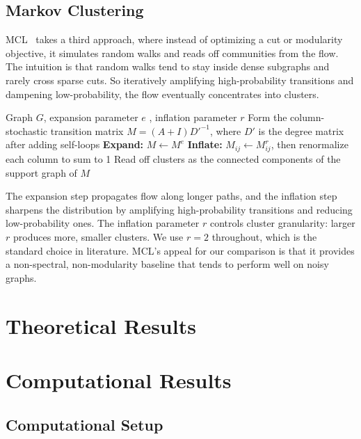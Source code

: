 \documentclass{article}
\theoremstyle{definition}
\theoremstyle{remark}
\begin{document}
\subsection{Markov Clustering}

MCL~\cite{vandongen2000} takes a third approach, where instead of optimizing a cut or modularity objective, it simulates random walks and reads off communities from the flow. The intuition is that random walks tend to stay inside dense subgraphs and rarely cross sparse cuts. So iteratively amplifying high-probability transitions and dampening low-probability, the flow eventually concentrates into clusters.

\begin{algorithm}[H]
\caption{Markov Clustering}
\begin{algorithmic}[1]
\Require Graph $G$, expansion parameter $e$ , inflation parameter $r$
\State Form the column-stochastic transition matrix $M = (A + I) D'^{-1}$, where $D'$ is the degree matrix after adding self-loops
\Repeat
    \State \textbf{Expand:} $M \gets M^e$
    \State \textbf{Inflate:} $M_{ij} \gets M_{ij}^r$, then renormalize each column to sum to 1
\State Read off clusters as the connected components of the support graph of $M$
\end{algorithmic}
\end{algorithm}

The expansion step propagates flow along longer paths, and the inflation step sharpens the distribution by amplifying high-probability transitions and reducing low-probability ones. The inflation parameter $r$ controls cluster granularity: larger $r$ produces more, smaller clusters. We use $r = 2$ throughout, which is the standard choice in literature. MCL's appeal for our comparison is that it provides a non-spectral, non-modularity baseline that tends to perform well on noisy graphs.



\section{Theoretical Results}

\section{Computational Results}

\subsection{Computational Setup}
\end{document}
